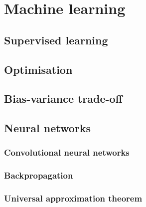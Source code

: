 \chapter{Machine learning}
\label{chap:ml}

\section{Supervised learning}

\section{Optimisation}
\section{Bias-variance trade-off}
\section{Neural networks}

\subsection{Convolutional neural networks}

\subsection{Backpropagation}
\subsection{Universal approximation theorem}